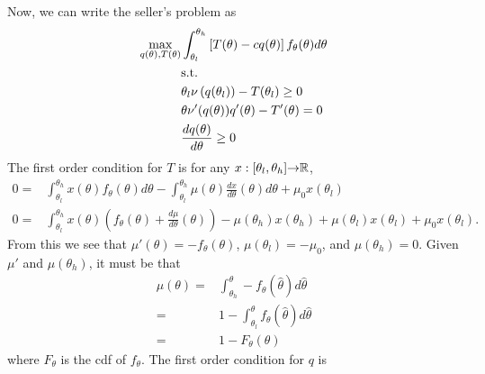Now, we can write the seller's problem as
\begin{align}
  \max_{q(\theta),T(\theta)} & \int_{\theta_l}^{\theta_h} 
  \left[T(\theta) - cq(\theta)\right]
  f_\theta(\theta) d\theta \notag \\
  & \text{s.t.} \notag \\
  &\theta_l \nu\left(q(\theta_l)\right) - T(\theta_l) \geq 0
  \label{pcl} \\
  & \theta \nu'(q(\theta))q'(\theta) - T'(\theta) =  0 \label{lic2} \\
  & \frac{dq(\theta)}{d\theta} \geq  0 \label{mon2}
\end{align}
The first order condition for $T$ is for any $x:[\theta_l,\theta_h] {\rightarrow} \mathbb{R}$, 
\begin{align*}
  0 = &\int_{\theta_l}^{\theta_h} x(\theta) f_\theta(\theta)
  d\theta - \int_{\theta_l}^{\theta_h} \mu(\theta)
  \frac{dx}{d\theta}(\theta) d\theta + \mu_0 x(\theta_l)  \\
  0 = & \int_{\theta_l}^{\theta_h} x(\theta)\left( f_\theta(\theta) +
    \frac{d\mu}{d \theta}(\theta)\right) - \mu(\theta_h)x(\theta_h) +
  \mu(\theta_l)x(\theta_l) + \mu_0 x(\theta_l).
\end{align*}
From this we see that $\mu'(\theta) = -f_\theta(\theta)$,
$\mu(\theta_l) = -\mu_0$, and $\mu(\theta_h) = 0$. Given $\mu'$ and
$\mu(\theta_h)$, it must be that
\begin{align*}
  \mu(\theta) = & \int_{\theta_h}^\theta -f_\theta(\hat{\theta}) d\hat{\theta} \\
  = & 1 - \int_{\theta_l}^\theta f_{\theta}(\hat{\theta})d\hat{\theta}
  \\
  = & 1 - F_\theta(\theta) 
\end{align*}
where $F_\theta$ is the cdf of $f_\theta$. 
The first order condition for $q$ is
